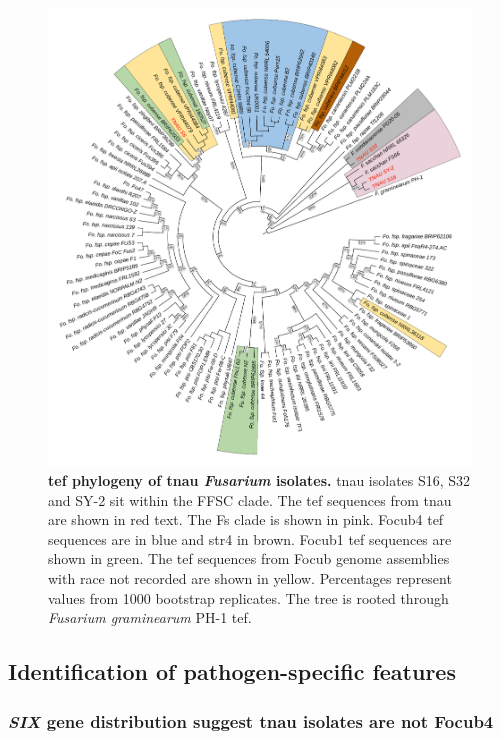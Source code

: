 \begin{figure}[htp!]
    \centering
    \includegraphics[width=14cm]{Figures/TEF1-aPhylo3.pdf}
    \caption[\Acl{tef} phylogeny of \acl{tnau} \textit{Fusarium} isolates.]{\textbf{\Acl{tef} phylogeny of \acl{tnau} \textit{Fusarium} isolates.} \Ac{tnau} isolates S16, S32 and SY-2 sit within the \acf{FFSC} clade. The \ac{tef} sequences from \ac{tnau} are shown in red text. The \acf{Fs} clade is shown in pink. \Acf{Focub4} \ac{tef} sequences are in blue and \acf{str4} in brown. \Acf{Focub1} \ac{tef} sequences are shown in green. The \ac{tef} sequences from \acf{Focub} genome assemblies with race not recorded are shown in yellow. Percentages represent values from 1000 bootstrap replicates. The tree is rooted through \textit{Fusarium graminearum} PH-1 \ac{tef}.}
    \label{fig:TEF1aPhylo}
\end{figure}
\bigskip

\subsection{Identification of pathogen-specific features}

\subsubsection{\textit{SIX} gene distribution suggest \ac{tnau} isolates are not \acl{Focub4}}
\label{sec:chap2SixGene}

